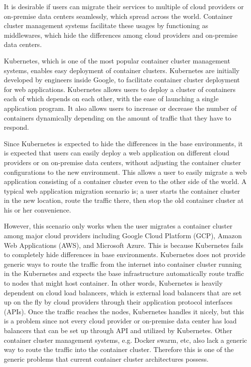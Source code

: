 It is desirable if users can migrate their services to multiple of cloud providers or on-premise data centers seamlessly, which spread across the world.
Container cluster management systems facilitate these usages by functioning as middlewares, which hide the differences among cloud providers and on-premise data centers.

Kubernetes\cite{K8s2017}, which is one of the most popular container cluster management systems, enables easy deployment of container clusters.
Kubernetes are initially developed by engineers inside Google, to facilitate container cluster deployment for web applications.
Kubernetes allows users to deploy a cluster of containers each of which depends on each other, with the ease of launching a single application program.
It also allows users to increase or decrease the number of containers dynamically depending on the amount of traffic that they have to respond.

Since Kubernetes is expected to hide the differences in the base environments, it is expected that users can easily deploy a web application on different cloud providers or on on-premise data centers, without adjusting the container cluster configurations to the new environment. 
This allows a user to easily migrate a web application consisting of a container cluster even to the other side of the world.
A typical web application migration scenario is; 
a user starts the container cluster in the new location, route the traffic there, then stop the old container cluster at his or her convenience.

However, this scenario only works when the user migrates a container cluster among major cloud providers including Google Cloud Platform (GCP), Amazon Web Applications (AWS), and Microsoft Azure.
This is because Kubernetes fails to completely hide differences in base environments.
Kubernetes does not provide generic ways to route the traffic from the internet into container cluster running in the Kubernetes and expects the base infrastructure automatically route traffic to nodes that might host container.
In other words, Kubernetes is heavily dependent on cloud load balancers, which is external load balancers that are set up on the fly by cloud providers through their application protocol interfaces (APIs).
Once the traffic reaches the nodes, Kubernetes handles it nicely, but this is a problem since not every cloud provider or on-premise data center has load balancers that can be set up through API and utilized by Kubernetes.
Other container cluster management systems, e.g. Docker swarm, etc, also lack a generic way to route the traffic into the container cluster.
Therefore this is one of the generic problems that current container cluster architectures possess.

